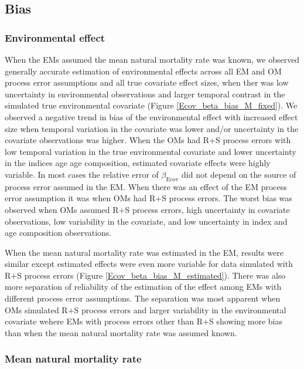 \documentclass[
  12pt,
]{article}
\begin{document}
\hypertarget{bias-1}{%
\subsection*{Bias}\label{bias-1}}

\hypertarget{environmental-effect}{%
\subsubsection*{Environmental effect}\label{environmental-effect}}

When the EMs assumed the mean natural mortality rate was known, we
observed generally accurate estimation of environmental effects across
all EM and OM process error assumptions and all true covariate effect
sizes, when ther was low uncertainty in environmental observations and
larger temporal contrast in the simulated true environmental covariate
(Figure \ref{Ecov_beta_bias_M_fixed}). We observed a negative trend in
bias of the environmental effect with increased effect size when
temporal variation in the covariate was lower and/or uncertainty in the
covariate observations was higher. When the OMs had R+S process errors
with low temporal variation in the true environmental covariate and
lower uncertainty in the indices age age composition, estimated
covariate effects were highly variable. In most cases the relative error
of \(\beta_\text{Ecov}\) did not depend on the source of process error
assumed in the EM. When there was an effect of the EM process error
assumption it was when OMs had R+S process errors. The worst bias was
observed when OMs assumed R+S process errors, high uncertainty in
covariate observations, low variability in the covariate, and low
uncertainty in index and age composition observations.

When the mean natural mortality rate was estimated in the EM, results
were similar except estimated effects were even more variable for data
simulated with R+S process errors (Figure
\ref{Ecov_beta_bias_M_estimated}). There was also more separation of
reliability of the estimation of the effect among EMs with different
process error assumptions. The separation was most apparent when OMs
simulated R+S process errors and larger variability in the environmental
covariate wehere EMs with process errors other than R+S showing more
bias than when the mean natural mortality rate was assumed known.

\hypertarget{mean-natural-mortality-rate}{%
\subsubsection*{Mean natural mortality
rate}\label{mean-natural-mortality-rate}}
\end{document}

